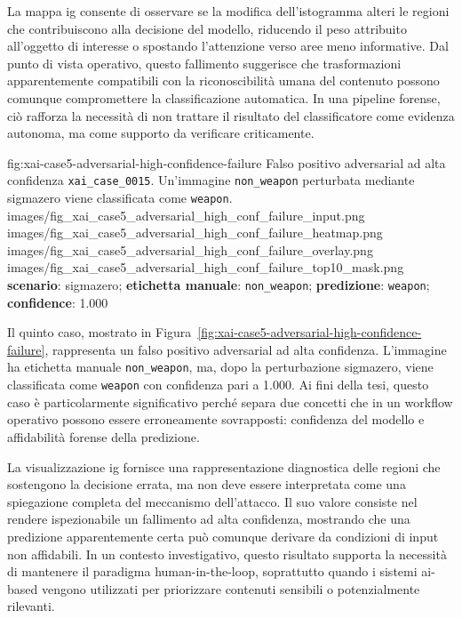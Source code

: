 La mappa \gls{ig} consente di osservare se la modifica dell'istogramma alteri le
regioni che contribuiscono alla decisione del modello, riducendo il peso
attribuito all'oggetto di interesse o spostando l'attenzione verso aree meno
informative. Dal punto di vista operativo, questo fallimento suggerisce che
trasformazioni apparentemente compatibili con la riconoscibilità umana del
contenuto possono comunque compromettere la classificazione automatica. In una
pipeline forense, ciò rafforza la necessità di non trattare il risultato del
classificatore come evidenza autonoma, ma come supporto da verificare
criticamente.

\XAIcaseFigureMaskGrid
{fig:xai-case5-adversarial-high-confidence-failure}
{Falso positivo adversarial ad alta confidenza \texttt{xai\_case\_0015}. Un'immagine
\texttt{non\_weapon} perturbata mediante \gls{sigmazero} viene classificata come
\texttt{weapon}.}
{images/fig_xai_case5_adversarial_high_conf_failure_input.png}
{images/fig_xai_case5_adversarial_high_conf_failure_heatmap.png}
{images/fig_xai_case5_adversarial_high_conf_failure_overlay.png}
{images/fig_xai_case5_adversarial_high_conf_failure_top10_mask.png}
{\textbf{scenario}: \gls{sigmazero};
 \textbf{etichetta manuale}: \texttt{non\_weapon};
 \textbf{predizione}: \texttt{weapon};
 \textbf{confidence}: 1.000}

Il quinto caso, mostrato in
Figura~\ref{fig:xai-case5-adversarial-high-confidence-failure}, rappresenta un
falso positivo adversarial ad alta confidenza. L'immagine ha etichetta manuale
\texttt{non\_weapon}, ma, dopo la perturbazione \gls{sigmazero}, viene
classificata come \texttt{weapon} con confidenza pari a 1.000. Ai fini della
tesi, questo caso è particolarmente significativo perché separa due concetti che
in un workflow operativo possono essere erroneamente sovrapposti: confidenza del
modello e affidabilità forense della predizione.

La visualizzazione \gls{ig} fornisce una rappresentazione diagnostica delle
regioni che sostengono la decisione errata, ma non deve essere interpretata come
una spiegazione completa del meccanismo dell'attacco. Il suo valore consiste nel
rendere ispezionabile un fallimento ad alta confidenza, mostrando che una
predizione apparentemente certa può comunque derivare da condizioni di input non
affidabili. In un contesto investigativo, questo risultato supporta la necessità
di mantenere il paradigma human-in-the-loop, soprattutto quando i sistemi
\gls{ai}-based vengono utilizzati per priorizzare contenuti sensibili o
potenzialmente rilevanti.

